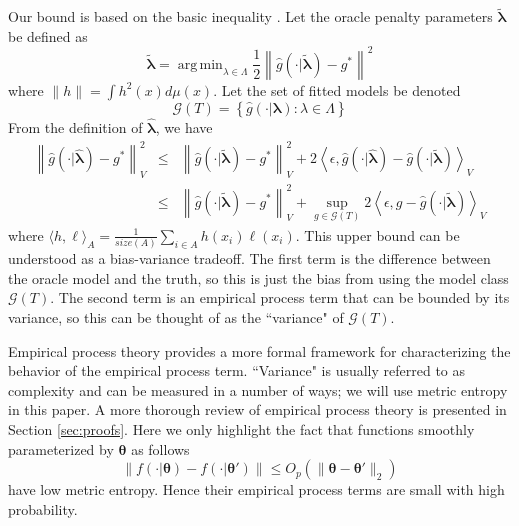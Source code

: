 \documentclass[12pt]{article}
\DeclareMathOperator*{\argmin}{arg\,min}
\begin{document}
Our bound is based on the basic inequality \citep{van2000empirical}. Let the oracle penalty parameters $\tilde{\boldsymbol \lambda}$ be defined as
\begin{equation}
\tilde{\boldsymbol \lambda} = \argmin_{\lambda \in \Lambda} \frac{1}{2} \left \| \hat{g}(\cdot | \tilde{\boldsymbol \lambda}) - g^* \right \|^2
\end{equation}
where $\| h \| = \int h^2(x) d\mu(x)$. Let the set of fitted models be denoted
\begin{equation}
\label{function_class_GT}
\mathcal{G}(T) = \left \{ \hat{g}(\cdot | \boldsymbol \lambda) : \lambda \in \Lambda  \right \}
\end{equation}
From the definition of $\hat{\boldsymbol \lambda}$, we have
\begin{eqnarray}
\label{basic_ineq}
\left \|\hat{g}(\cdot | \hat{\boldsymbol \lambda}) - g^* \right \|_V^2
& \le &
\left \| \hat{g}(\cdot | \tilde{\boldsymbol \lambda}) - g^* \right \|_V^2 +
2 \left \langle \epsilon, \hat{g}(\cdot | \hat{\boldsymbol \lambda}) - \hat{g}(\cdot | \tilde{\boldsymbol \lambda}) \right \rangle_V \\
& \le &
\left \| \hat{g}(\cdot | \tilde{\boldsymbol \lambda}) - g^* \right \|_V^2 +
\sup_{g \in \mathcal{G}(T)} 2 \left \langle \epsilon, g - \hat{g}(\cdot | \tilde{\boldsymbol \lambda}) \right \rangle_V
\end{eqnarray}
where $\langle h, \ell \rangle_A = \frac{1}{size(A)}\sum_{i\in A} h(x_i) \ell(x_i)$. This upper bound can be understood as a bias-variance tradeoff. The first term is the difference between the oracle model and the truth, so this is just the bias from using the model class $\mathcal{G}(T)$. The second term is an empirical process term that can be bounded by its variance, so this can be thought of as the ``variance" of $\mathcal{G}(T)$.

Empirical process theory provides a more formal framework for characterizing the behavior of the empirical process term. ``Variance" is usually referred to as complexity and can be measured in a number of ways; we will use metric entropy in this paper. A more thorough review of empirical process theory is presented in Section \ref{sec:proofs}. Here we only highlight the fact that functions smoothly parameterized by $\boldsymbol \theta$ as follows
\begin{equation}
\left \| f(\cdot | \boldsymbol \theta) - f(\cdot | \boldsymbol \theta') \right \|
\le
O_p \left (\| \boldsymbol \theta - \boldsymbol \theta' \|_2 \right ) 
\end{equation}
have low metric entropy. Hence their empirical process terms are small with high probability.
\end{document}
